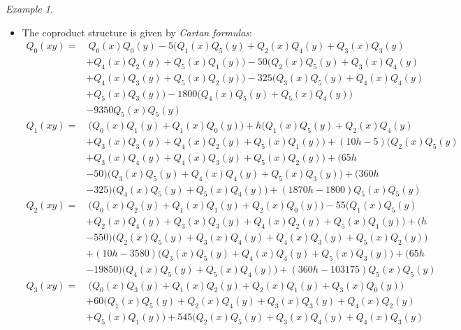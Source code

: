 \documentclass{gtpart}
\theoremstyle{definition}
\theoremstyle{remark}
\newtheorem{ex}[thm]{Example}
\renewcommand{\=}{\approx}
\renewcommand{\-}{\sim}
\numberwithin{equation}{section}
\numberwithin{thm}{section}
\begin{document}
\begin{ex}
\begin{itemize}
  \item The coproduct structure is given by {\em Cartan formulas}: 
  \begin{equation*}
   \begin{split}
    Q_0(x y) = & ~ Q_0(x) Q_0(y) - 5 \big( Q_1(x) Q_5(y) + Q_2(x) Q_4(y) + Q_3(x) Q_3(y) \\
               & + Q_4(x) Q_2(y) + Q_5(x) Q_1(y) \big) - 50 \big( Q_2(x) Q_5(y) + Q_3(x) Q_4(y) \\
               & + Q_4(x) Q_3(y) + Q_5(x) Q_2(y) \big) - 325 \big( Q_3(x) Q_5(y) + Q_4(x) Q_4(y) \\
               & + Q_5(x) Q_3(y) \big) - 1800 \big( Q_4(x) Q_5(y) + Q_5(x) Q_4(y) \big) \\
               & - 9350 Q_5(x) Q_5(y) \\
    Q_1(x y) = & ~ \big( Q_0(x) Q_1(y) + Q_1(x) Q_0(y) \big) + h \big( Q_1(x) Q_5(y) + Q_2(x) Q_4(y) \\
               & + Q_3(x) Q_3(y) + Q_4(x) Q_2(y) + Q_5(x) Q_1(y) \big) + (10 h - 5) \big( Q_2(x) Q_5(y) \\
               & + Q_3(x) Q_4(y) + Q_4(x) Q_3(y) + Q_5(x) Q_2(y) \big) + (65 h \\
               & - 50) \big( Q_3(x) Q_5(y) + Q_4(x) Q_4(y) + Q_5(x) Q_3(y) \big) + (360 h \\
               & - 325) \big( Q_4(x) Q_5(y) + Q_5(x) Q_4(y) \big) + (1870 h - 1800) Q_5(x) Q_5(y) \\
    Q_2(x y) = & ~ \big( Q_0(x) Q_2(y) + Q_1(x) Q_1(y) + Q_2(x) Q_0(y) \big) - 55 \big( Q_1(x) Q_5(y) \\
               & + Q_2(x) Q_4(y) + Q_3(x) Q_3(y) + Q_4(x) Q_2(y) + Q_5(x) Q_1(y) \big) + (h \\
               & - 550) \big( Q_2(x) Q_5(y) + Q_3(x) Q_4(y) + Q_4(x) Q_3(y) + Q_5(x) Q_2(y) \big) \\
               & + (10 h - 3580) \big( Q_3(x) Q_5(y) + Q_4(x) Q_4(y) + Q_5(x) Q_3(y) \big) + (65 h \\
               & - 19850) \big( Q_4(x) Q_5(y) + Q_5(x) Q_4(y) \big) + (360 h - 103175) Q_5(x) Q_5(y) \\
    Q_3(x y) = & ~ \big( Q_0(x) Q_3(y) + Q_1(x) Q_2(y) + Q_2(x) Q_1(y) + Q_3(x) Q_0(y) \big) \\
               & + 60 \big( Q_1(x) Q_5(y) + Q_2(x) Q_4(y) + Q_3(x) Q_3(y) + Q_4(x) Q_2(y) \\
               & + Q_5(x) Q_1(y) \big) + 545 \big( Q_2(x) Q_5(y) + Q_3(x) Q_4(y) + Q_4(x) Q_3(y) \\

\end{split}
\end{equation*}
\end{itemize}
\end{ex}
\end{document}
